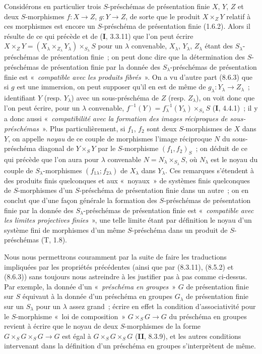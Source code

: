 \begin{scholium}[8.8.3]
Considérons en particulier trois $S$-préschémas de présentation finie $X$,
$Y$, $Z$ et deux $S$-morphismes $f:X\to Z$, $g:Y\to Z$, de sorte que le
produit $X\times_ZY$ relatif à ces morphismes est encore un $S$-préschéma de
présentation finie (1.6.2). Alors il résulte de ce qui précède et de
(\textbf{I}, 3.3.11) que l'on peut écrire
$X\times_ZY=(X_\lambda\times_{Z_\lambda}Y_\lambda)\times_{S_\lambda}S$ pour
un $\lambda$ convenable, $X_\lambda$, $Y_\lambda$, $Z_\lambda$ étant des
$S_\lambda$-préschémas de présentation finie~; on peut donc dire que la
détermination des $S$-préschémas de présentation finie par la donnée des
$S_\lambda$-préschémas de présentation finie est «~\emph{compatible avec les
produits fibrés}~». On a vu d'autre part (8.6.3) que si $g$ est une immersion,
on peut supposer qu'il en est de même de $g_\lambda:Y_\lambda\to Z_\lambda$~;
identifiant $Y$ (resp. $Y_\lambda$) avec un sous-préschéma de $Z$ (resp.
$Z_\lambda$), on voit donc que l'on peut écrire, pour un $\lambda$ convenable,
$f^{-1}(Y)=f_\lambda^{-1}(Y_\lambda)\times_{S_\lambda}S$ (\textbf{I}, 4.4.1)~; il y a
donc aussi «~\emph{compatibilité avec la formation des images réciproques de
sous-préschémas}~». Plus particulièrement, si $f_1$, $f_2$ sont deux
$S$-morphismes de $X$ dans $Y$, on appelle \emph{noyau} de ce couple de
morphismes l'image réciproque $N$ du sous-préschéma diagonal de $Y\times_SY$
par le $S$-morphisme $(f_1,f_2)_S$~; on déduit de ce qui précède que l'on aura
pour $\lambda$ convenable $N=N_\lambda\times_{S_\lambda}S$, où $N_\lambda$
est le noyau du couple de $S_\lambda$-morphismes
$(f_{1\lambda};f_{2\lambda})$ de $X_\lambda$ dans $Y_\lambda$. Ces remarques
s'étendent à des produits finis quelconques et aux «~noyaux~» de systèmes
finis quelconques de $S$-morphismes d'un $S$-préschéma de présentation finie
dans un autre~; on en conclut que d'une façon générale la formation des
$S$-préschémas de présentation finie par la donnée des
$S_\lambda$-préschémas de présentation finie est «~\emph{compatible avec les
limites projectives finies}~», une telle limite étant par définition le noyau
d'un système fini de morphismes d'un même $S$-préschéma dans un produit de
$S$-préschémas (T, 1.8).

Nous nous permettrons couramment par la suite de faire les traductions
impliquées par les propriétés précédentes (ainsi que par (8.3.11), (8.5.2) et
(8.6.3)) sans toujours nous astreindre à les justifier pas à pas comme
ci-dessus. Par exemple, la donnée d'un «~\emph{préschéma en groupes}~» $G$ de
présentation finie sur $S$ équivaut à la donnée d'un préschéma en groupes
$G_\lambda$ de présentation finie sur un $S_\lambda$ pour un $\lambda$ assez
grand~; écrire en effet la condition d'associativité pour le $S$-morphisme
«~loi de composition~» $G\times_SG\to G$ du préschéma en groupes revient à
écrire que le noyau de deux $S$-morphismes de la forme
$G\times_SG\times_SG\to G$ est égal à $G\times_SG\times_SG$ (\textbf{II}, 8.3.9), et
les autres conditions intervenant dans la définition d'un préschéma en
groupes s'interprètent de même.
\end{scholium}

